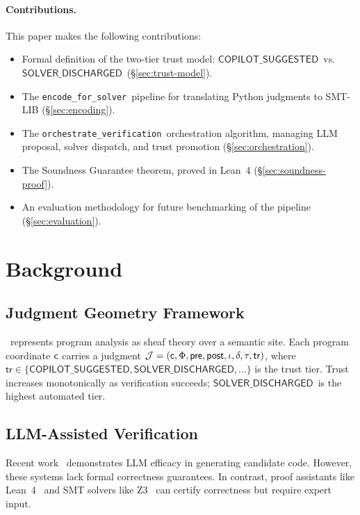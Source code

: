 \documentclass[11pt]{article}
\newcommand{\CopilotSugg}{\ensuremath{\mathsf{COPILOT\_SUGGESTED}}}
\newcommand{\SolverDisch}{\ensuremath{\mathsf{SOLVER\_DISCHARGED}}}
\newcommand{\OrchestrateVerif}{\texttt{orchestrate\_verification}}
\newcommand{\props}{\Phi}                           %
\newcommand{\precond}{\mathsf{pre}}                  %
\newcommand{\postcond}{\mathsf{post}}                %
\providecommand{\inv}{\iota}                         %
\newcommand{\tr}{\mathsf{tr}}                        %
\newcommand{\EncodeForSolver}{\texttt{encode\_for\_solver}}
\begin{document}
\paragraph{Contributions.}
This paper makes the following contributions:
\begin{itemize}[noitemsep]
  \item Formal definition of the two-tier trust model: \CopilotSugg\ vs.\ 
        \SolverDisch\ (§\ref{sec:trust-model}).
  \item The \EncodeForSolver\ pipeline for translating Python judgments to 
        SMT-LIB (§\ref{sec:encoding}).
  \item The \OrchestrateVerif\ orchestration algorithm, managing LLM proposal, 
        solver dispatch, and trust promotion (§\ref{sec:orchestration}).
  \item The Soundness Guarantee theorem, proved in Lean~4 
        (§\ref{sec:soundness-proof}).
  \item An evaluation methodology for future benchmarking of the pipeline
        (§\ref{sec:evaluation}).
\end{itemize}

\section{Background}\label{sec:background}

\subsection{Judgment Geometry Framework}
\JuGeo\ represents program analysis as sheaf theory over a semantic site. 
Each program coordinate $\mathsf{c}$ carries a judgment $\J = (\coord, \props, 
\precond, \postcond, \inv, \delta, \tau, \tr)$, where $\tr \in \{\CopilotSugg, 
\SolverDisch, \ldots\}$ is the trust tier. Trust increases monotonically as 
verification succeeds; \SolverDisch\ is the highest automated tier.

\subsection{LLM-Assisted Verification}
Recent work~\cite{Copilot2021,CodeGen2022} demonstrates LLM efficacy in 
generating candidate code. However, these systems lack formal correctness 
guarantees. In contrast, proof assistants like Lean~4~\cite{Lean4} and SMT 
solvers like Z3~\cite{Z32008} can certify correctness but require expert 
input.
\end{document}
